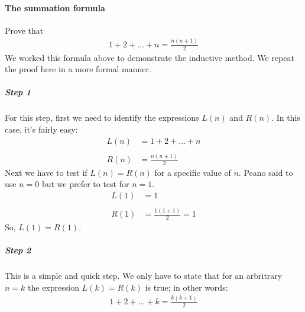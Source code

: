 \documentclass[letterpaper,10pt,english]{sphinxmanual}
\begin{document}
\paragraph{The summation formula}
\label{\detokenize{COMP163/notes/induction:the-summation-formula}}
Prove that
\begin{equation*}
\begin{split}1+2+\ldots + n = \frac{n(n+1)}{2}\end{split}
\end{equation*}
We worked this formula above to demonstrate the inductive method. We repeat the proof here in a more formal manner.


\subparagraph{Step 1}
\label{\detokenize{COMP163/notes/induction:id1}}
For this step, first we need to identify the expressions \(L(n)\) and \(R(n)\). In this case, it’s fairly easy:
\begin{equation*}
\begin{split}L(n) &= 1+2+\ldots + n \\ \\
R(n) &= \frac{n(n+1)}{2}\end{split}
\end{equation*}
Next we have to test if \(L(n)=R(n)\) for a specific value of \(n\). Peano said to use \(n=0\) but we prefer to test for \(n=1\).
\begin{equation*}
\begin{split}L(1)&=1  \\ \\
R(1)&=\frac{1(1+1)}{2}=1\end{split}
\end{equation*}
So, \(L(1)=R(1)\).


\subparagraph{Step 2}
\label{\detokenize{COMP163/notes/induction:id2}}
This is a simple and quick step. We only have to state that for an arbritrary \(n=k\) the expression \(L(k)=R(k)\) is true; in other words:
\begin{equation*}
\begin{split}1+2+\ldots +k = \frac{k(k+1)}{2}\end{split}
\end{equation*}
\end{document}
